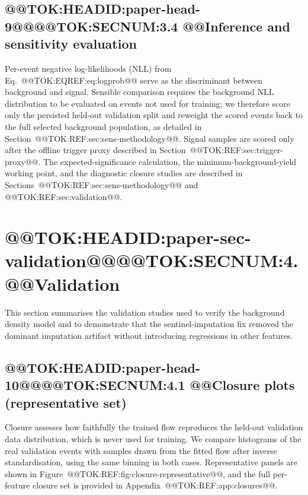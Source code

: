 \documentclass[11pt]{article}
\begin{document}
\subsection{@@TOK:HEADID:paper-head-9@@@@TOK:SECNUM:3.4 @@Inference and sensitivity evaluation}

Per-event negative log-likelihoods (NLL) from Eq.~@@TOK:EQREF:eq:logprob@@ serve
as the discriminant between background and signal. Sensible comparison
requires the background NLL distribution to be evaluated on events not used
for training; we therefore score only the persisted held-out validation
split and reweight the scored events back to the full selected background
population, as detailed in Section~@@TOK:REF:sec:sens-methodology@@. Signal
samples are scored only after the offline trigger proxy described in
Section~@@TOK:REF:sec:trigger-proxy@@. The expected-significance calculation,
the minimum-background-yield working point, and the diagnostic closure
studies are described in Sections~@@TOK:REF:sec:sens-methodology@@ and
@@TOK:REF:sec:validation@@.

\section{@@TOK:HEADID:paper-sec-validation@@@@TOK:SECNUM:4. @@Validation}

This section summarises the validation studies used to verify the background
density model and to demonstrate that the sentinel-imputation fix removed
the dominant imputation artifact without introducing regressions in other
features.

\subsection{@@TOK:HEADID:paper-head-10@@@@TOK:SECNUM:4.1 @@Closure plots (representative set)}

Closure assesses how faithfully the trained flow reproduces the held-out
validation data distribution, which is never used for training. We compare
histograms of the real validation events with samples drawn from the fitted
flow after inverse standardisation, using the same binning in both cases.
Representative panels are shown in Figure~@@TOK:REF:fig:closure-representative@@,
and the full per-feature closure set is provided in
Appendix~@@TOK:REF:app:closures@@.
\end{document}
